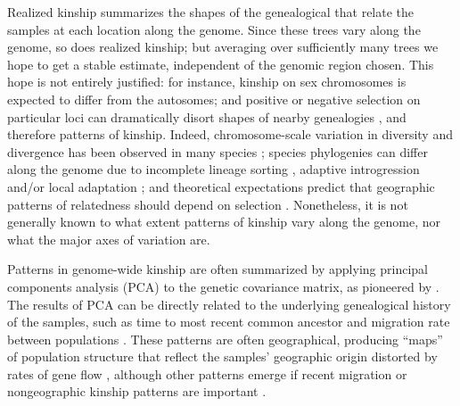 \documentclass[11pt, oneside]{article}   	%
\begin{document}
Realized kinship summarizes the shapes
of the genealogical that relate the samples
at each location along the genome.
Since these trees vary along the genome, so does realized kinship;
but averaging over sufficiently many trees we hope to get a stable estimate,
independent of the genomic region chosen.
This hope is not entirely justified: for instance,
kinship on sex chromosomes is expected to differ from the autosomes;
and positive or negative selection on particular loci can dramatically disort shapes of nearby genealogies
\citep{maynardsmith1974hitchhiking,barton2000genetic,neher2013genetic,charlesworth2012effects},
and therefore patterns of kinship.
Indeed,
chromosome-scale variation in diversity and divergence has been observed in many species
\citep[e.g.][]{langley2012genomic};
species phylogenies can differ along the genome 
due to incomplete lineage sorting \citep[e.g.][]{pease2013accurate},
adaptive introgression and/or local adaptation \citep[e.g.][]{ellegren2012genomic,nadeau2012genomic,pool2015natural,vernot2014resurrecting};
and theoretical expectations predict that geographic patterns of relatedness should depend on selection
\citet{charlesworth2003review}.
Nonetheless, it is not generally known to what extent patterns of kinship vary along the genome,
nor what the major axes of variation are.


Patterns in genome-wide kinship are often summarized
by applying principal components analysis (PCA) \citep{patterson2006population} 
to the genetic covariance matrix,
as pioneered by \citet{menozzi1978synthetic}.
The results of PCA can be directly related to the underlying genealogical history of the samples, 
such as time to most recent common ancestor and migration rate between populations \citep{novembre2008interpreting,mcvean2009genealogical}. 
These patterns are often geographical, producing ``maps'' of population structure
that reflect the samples' geographic origin distorted by rates of gene flow
\citep{novembre2008genes},
although other patterns emerge if recent migration or nongeographic kinship patterns are important
\citep{astle2009population}.
\end{document}
